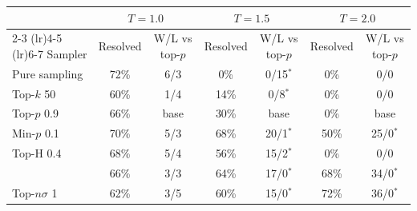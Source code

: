 \begin{tabular}{lcccccc}
\toprule
 & \multicolumn{2}{c}{$T{=}1.0$} & \multicolumn{2}{c}{$T{=}1.5$} & \multicolumn{2}{c}{$T{=}2.0$} \\
\cmidrule(lr){2-3} \cmidrule(lr){4-5} \cmidrule(lr){6-7}
Sampler & Resolved & W/L vs top-$p$ & Resolved & W/L vs top-$p$ & Resolved & W/L vs top-$p$ \\
\midrule
Pure sampling & 72\% & 6/3 & 0\% & 0/15$^{*}$ & 0\% & 0/0 \\
Top-$k$ 50 & 60\% & 1/4 & 14\% & 0/8$^{*}$ & 0\% & 0/0 \\
Top-$p$ 0.9 & 66\% & base & 30\% & base & 0\% & base \\
Min-$p$ 0.1 & 70\% & 5/3 & 68\% & 20/1$^{*}$ & 50\% & 25/0$^{*}$ \\
Top-H 0.4 & 68\% & 5/4 & 56\% & 15/2$^{*}$ & 0\% & 0/0 \\
\pless{} & 66\% & 3/3 & 64\% & 17/0$^{*}$ & 68\% & 34/0$^{*}$ \\
Top-$n\sigma$ 1 & 62\% & 3/5 & 60\% & 15/0$^{*}$ & 72\% & 36/0$^{*}$ \\
\bottomrule
\end{tabular}
